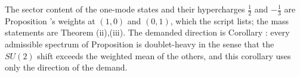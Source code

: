The sector content of the one-mode states and their hypercharges $\tfrac12$ and $-\tfrac13$ are Proposition 's weights at $(1,0)$ and $(0,1)$, which the script lists; the mass statements are Theorem (ii),(iii). The demanded direction is Corollary : every admissible spectrum of Proposition  is doublet-heavy in the sense that the $SU(2)$ shift exceeds the weighted mean of the others, and this corollary uses only the direction of the demand.
